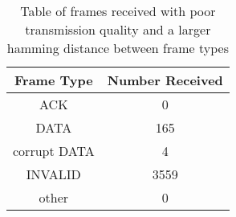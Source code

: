 \begin{table}
	\centering
		\begin{tabular}{| c | c | }
		\hline                       
		Frame Type & Number Received\\
		\hline
			ACK & 0\\
			DATA & 165\\
			corrupt DATA & 4\\
			INVALID & 3559\\
			other & 0\\
		\hline
		\end{tabular}
	\caption{Table of frames received with poor transmission quality and a larger hamming distance between frame types}
	\label{tab:0ACK}
\end{table}